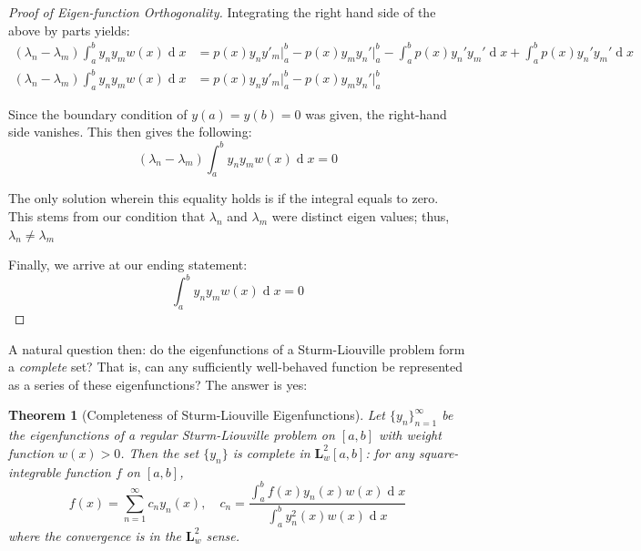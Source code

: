 \documentclass[12pt,a4paper]{report}
\DeclareMathOperator{\deriv}{d}
\theoremstyle{thms}
\newtheorem{theorem}{Theorem}[section]
\theoremstyle{defns}
\begin{document}
\begin{proof}[Proof of Eigen-function Orthogonality]
    Integrating the right hand side of the above by parts yields:
    \begin{align}
        (\lambda_n - \lambda_m)\int_{a}^{b}y_ny_mw(x) \deriv{x} & = p(x)y_ny'_m \Big|_a^b - p(x)y_my_n' \Big|_a^b - \int_{a}^{b}p(x)y_n'y_m' \deriv{x} + \int_{a}^{b}p(x)y_n'y_m' \deriv{x} \\
        (\lambda_n - \lambda_m)\int_{a}^{b}y_ny_mw(x) \deriv{x} & = p(x)y_ny'_m \Big|_a^b - p(x)y_my_n' \Big|_a^b
    \end{align}

    Since the boundary condition of $y(a) = y(b) = 0$ was given, the right-hand side vanishes. This then gives the following:
    \begin{equation}
        (\lambda_n - \lambda_m)\int_{a}^{b}y_ny_mw(x) \deriv{x} = 0
    \end{equation}

    The only solution wherein this equality holds is if the integral equals to zero. This stems from our condition that $\lambda_n$ and $\lambda_m$ were distinct eigen values; thus, $\lambda_n \neq \lambda_m$

    Finally, we arrive at our ending statement:
    \begin{equation}
        \int_{a}^{b}y_ny_mw(x) \deriv{x} = 0
    \end{equation}
\end{proof}

A natural question then: do the eigenfunctions of a Sturm-Liouville problem form a \textit{complete} set? That is, can any sufficiently well-behaved function be represented as a series of these eigenfunctions? The answer is yes:

\begin{theorem}[Completeness of Sturm-Liouville Eigenfunctions]
    Let $\{y_n\}_{n=1}^{\infty}$ be the eigenfunctions of a regular Sturm-Liouville problem on $[a, b]$ with weight function $w(x) > 0$. Then the set $\{y_n\}$ is complete in $\mathbf{L}^2_w[a, b]$: for any square-integrable function $f$ on $[a, b]$,
    \begin{equation}
        f(x) = \sum_{n=1}^{\infty} c_n y_n(x), \quad c_n = \dfrac{\int_a^b f(x)y_n(x)w(x)\deriv{x}}{\int_a^b y_n^2(x)w(x)\deriv{x}}
    \end{equation}
    where the convergence is in the $\mathbf{L}^2_w$ sense.
    \label{thm:sturm_completeness}
\end{theorem}
\end{document}
